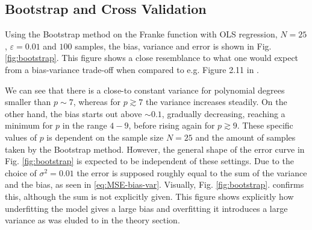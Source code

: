 \documentclass[%
reprint,
amsmath,amssymb,
aps,
pra,
]{revtex4-2}
\begin{document}
\subsection{Bootstrap and Cross Validation}
Using the Bootstrap method on the Franke function with OLS regression, $N=25$, $\varepsilon=0.01$ and \(100\) samples, the bias, variance and error is shown in Fig. \ref{fig:bootstrap}. This figure shows a close resemblance to what one would expect from a bias-variance trade-off when compared to e.g. Figure 2.11 in \cite{hastie01statisticallearning}. 

We can see that there is a close-to constant variance for polynomial degrees smaller than \(p\sim7\), whereas for \(p\gtrsim 7\) the variance increases steadily. On the other hand, the bias starts out above \(\sim0.1\), gradually decreasing, reaching a minimum for \(p\) in the range \(4-9\), before rising again for \(p\gtrsim 9\). These specific values of \(p\) is dependent on the sample size \(N=25\) and the amount of samples taken by the Bootstrap method. However, the general shape of the error curve in Fig. \ref{fig:bootstrap} is expected to be independent of these settings. Due to the choice of $\sigma^2=0.01$ the error is supposed roughly equal to the sum of the variance and the bias, as seen in \eqref{eq:MSE-bias-var}. Visually, Fig. \ref{fig:bootstrap}. confirms this, although the sum is not explicitly given. This figure shows explicitly how underfitting the model gives a large bias and overfitting it introduces a large variance as was eluded to in the theory section.
\end{document}
